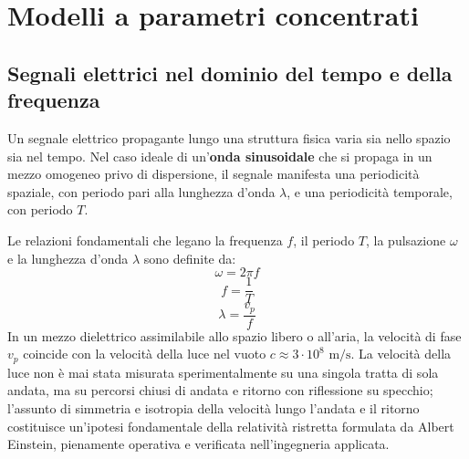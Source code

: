 \chapter{Modelli a parametri concentrati}
\section{Segnali elettrici nel dominio del tempo e della frequenza}
Un segnale elettrico propagante lungo una struttura fisica varia sia nello spazio sia nel tempo. Nel caso ideale di un'\textbf{onda sinusoidale} che si propaga in un mezzo omogeneo privo di dispersione, il segnale manifesta una periodicità spaziale, con periodo pari alla lunghezza d'onda $\lambda$, e una periodicità temporale, con periodo $T$.

Le relazioni fondamentali che legano la frequenza $f$, il periodo $T$, la pulsazione $\omega$ e la lunghezza d'onda $\lambda$ sono definite da:
\[
\omega = 2\pi f
\]
\[
f = \frac{1}{T}
\]
\[
\lambda = \frac{v_p}{f}
\]
In un mezzo dielettrico assimilabile allo spazio libero o all'aria, la velocità di fase $v_p$ coincide con la velocità della luce nel vuoto $c \approx 3 \cdot 10^8\text{ m/s}$. La velocità della luce non è mai stata misurata sperimentalmente su una singola tratta di sola andata, ma su percorsi chiusi di andata e ritorno con riflessione su specchio; l'assunto di simmetria e isotropia della velocità lungo l'andata e il ritorno costituisce un'ipotesi fondamentale della relatività ristretta formulata da Albert Einstein, pienamente operativa e verificata nell'ingegneria applicata.

